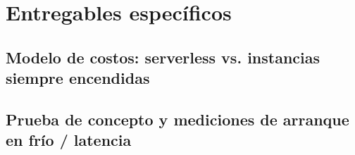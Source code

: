 
\section{Entregables específicos}

\subsection{Modelo de costos: serverless vs. instancias siempre encendidas}

%

\subsection{Prueba de concepto y mediciones de arranque en frío / latencia}


